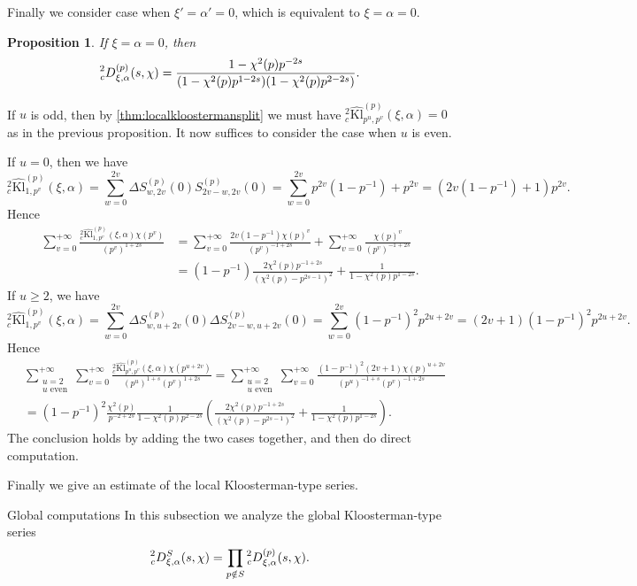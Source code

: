 \documentclass[10pt,oneside,reqno]{amsart}
\makeatletter
\newcommand\Kl{\mathrm{Kl}}
\renewcommand\geq{\geqslant}
\def\subsection{\@startsection{subsection}{2}%
  \z@{3pt\@plus0pt}{-.5em}%
  {\normalfont\bfseries}}
\theoremstyle{THEOREM}
\newtheorem{proposition}[theorem]{Proposition}
\theoremstyle{DEFINITION}
\theoremstyle{EXERCISE}
\numberwithin{equation}{section}
\renewenvironment{proof}[1][\proofname]{\par
  \vspace{-6pt}
  \pushQED{\qed}
  \normalfont \topsep6\p@\@plus6\p@\relax
  \trivlist
  \item[\hskip\labelsep\rmfamily\bfseries
    #1\@addpunct{:}]\ignorespaces
}{
  \popQED\endtrivlist\@endpefalse
  \vspace{-6pt}
}
\makeatother
\begin{document}
Finally we consider case when $\xi'=\alpha'=0$, which is equivalent to $\xi=\alpha=0$.
\begin{proposition}\label{prop:zerosplit}
If $\xi=\alpha=0$, then
\[
\prescript{2}{c}D_{\xi,\alpha}^{(p)}(s,\chi)=\frac{1-\chi^2(p)p^{-2s}}{(1-\chi^2(p)p^{1-2s}) (1-\chi^2(p)p^{2-2s})}.
\]
\end{proposition}
\begin{proof}
If $u$ is odd, then by \autoref{thm:localkloostermansplit} we must have ${}_c^2\widehat{\Kl}_{p^u,p^v}^{(p)}(\xi,\alpha)=0$ as in the previous proposition. It now suffices to consider the case when $u$ is even.

If $u=0$, then we have
\[
{}_c^2\widehat{\Kl}_{1,p^v}^{(p)}(\xi,\alpha)=\sum_{w=0}^{2v}\Delta S_{w,2v}^{(p)}(0)S_{2v-w,2v}^{(p)}(0)=\sum_{w=0}^{2v}p^{2v}(1-p^{-1})+p^{2v}= (2v(1-p^{-1})+1)p^{2v}.
\]
Hence
\begin{align*}
\sum_{v=0}^{+\infty}\frac{{}_c^2\widehat{\Kl}_{1,p^v}^{(p)}(\xi,\alpha)\chi(p^v)} {(p^v)^{1+2s}}&= \sum_{v=0}^{+\infty}\frac{2v(1-p^{-1})\chi(p)^v}{(p^v)^{-1+2s}}+\sum_{v=0}^{+\infty} \frac{\chi(p)^v}{(p^v)^{-1+2s}}\\
&=(1-p^{-1})\frac{2\chi^2(p)p^{-1+2s}} {(\chi^2(p)-p^{2s-1})^2}+ \frac{1}{1-\chi^2(p)p^{1-2s}}.
\end{align*}
If $u\geq 2$, we have
\[
{}_c^2\widehat{\Kl}_{1,p^v}^{(p)}(\xi,\alpha)=\sum_{w=0}^{2v}\Delta S_{w,u+2v}^{(p)}(0)\Delta S_{2v-w,u+2v}^{(p)}(0)=\sum_{w=0}^{2v}(1-p^{-1})^2p^{2u+2v}=(2v+1)(1-p^{-1})^2p^{2u+2v}.
\]
Hence
\begin{align*}
&\sum_{\substack{u=2\\u\text{ even}}}^{+\infty}\sum_{v=0}^{+\infty}\frac{{}_c^2\widehat{\Kl}_{p^u,p^v}^{(p)}(\xi,\alpha)\chi(p^{u+2v})} {(p^u)^{1+s}(p^v)^{1+2s}}= \sum_{\substack{u=2\\u\text{ even}}}^{+\infty}\sum_{v=0}^{+\infty}\frac{(1-p^{-1})^2(2v+1)\chi(p)^{u+2v}} {(p^u)^{-1+s}(p^v)^{-1+2s}} \\
&=(1-p^{-1})^2\frac{\chi^2(p)}{p^{-2+2s}}\frac{1}{1-\chi^2(p)p^{2-2s}} \left(\frac{2\chi^2(p)p^{-1+2s}}{(\chi^2(p)-p^{2s-1})^2}+\frac{1}{1-\chi^2(p)p^{1-2s}}\right).
\end{align*}
The conclusion holds by adding the two cases together, and then do direct computation.
\end{proof}

Finally we give an estimate of the local Kloosterman-type series.

\subsection{Global computations}
In this subsection we analyze the global Kloosterman-type series 
\[
\prescript{2}{c}D^S_{\xi,\alpha}(s,\chi)=\prod_{p\notin S}\prescript{2}{c}D_{\xi,\alpha}^{(p)}(s,\chi).
\]
\end{document}
